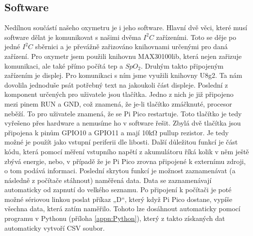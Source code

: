 \subsection {Software}
Nedílnou součástí našeho oxymetru je i jeho software. Hlavní dvě věci, které musí software dělat je komunikovat s našimi dvěma $I^2C$ zařízeními. Toto se děje po jedné $I^2C$ sběrnici a je převážně zařizováno knihovnami určenými pro daná zařízení. Pro oxymetr jsem použili knihovnu MAX30100lib, která nejen zařizuje komunikaci, ale také přímo počítá tep a $SpO_2$. Druhým takto připojeným zařízením je displej. Pro komunikaci s ním jsme využili knihovny U8g2. Ta nám dovolila jednoduše psát potřebný text na jakoukoli část displeje. Poslední z komponent určených pro  uživatele jsou tlačítka. Jedno z nich je již připojeno mezi pinem RUN a GND, což znamená, že je-li tlačítko zmáčknuté, procesor neběží. To pro uživatele znamená, že se Pi Pico restartuje. Toto tlačítko je tedy vyřešeno přes hardware a nemusíme ho v software řešit. Zbylá dvě tlačítka jsou připojena k pinům GPIO10 a GPIO11 a mají 10kΩ pullup rezistor. Je tedy možné je použít jako vstupní periferii dle libosti. Další důležitou funkcí je část kódu, která pomocí měření vstupního napětí z akumulátoru říká kolik v něm ještě zbývá energie, nebo, v případě že je Pi Pico zrovna připojené k externímu zdroji, o tom podává informaci. Poslední skrytou funkcí je možnost zaznamenávat (a následně z počítače stáhnout) naměřená data. Data se zaznamenávají automaticky od zapnutí do velkého seznamu. Po připojení k počítači je poté možné sériovou linkou poslat příkaz „D“, který když Pi Pico dostane, vypíše všechna data, která zatím naměřilo. Tohoto lze dosáhnout automaticky pomocí programu v Pythonu (příloha \ref{appn:Python}), který z takto získaných dat automaticky vytvoří CSV soubor.